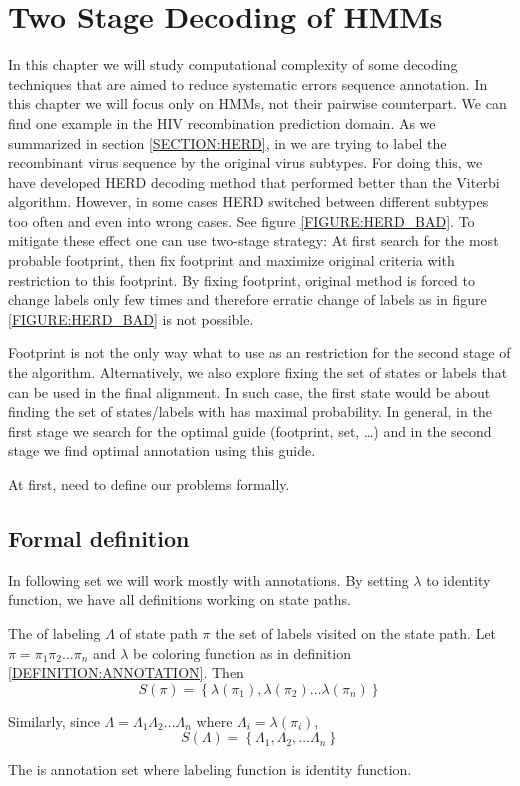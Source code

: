 \chapter{Two Stage Decoding of HMMs}

In this chapter we will study computational complexity of some decoding
techniques that are aimed to reduce systematic errors sequence annotation. In
this chapter we will focus only on HMMs, not their pairwise counterpart. We can
find one example in the HIV recombination prediction domain. As we summarized in 
section \ref{SECTION:HERD}, in  we are trying to label
the recombinant virus sequence by the original virus subtypes. For doing this,
we have developed HERD decoding method \cite{Nanasi2010, Nanasi2010mgr} that
performed better than the Viterbi algorithm. However, in some cases HERD
switched between different subtypes too often and even into wrong cases. See
figure \ref{FIGURE:HERD_BAD}. To mitigate these effect one can use two-stage
strategy: At first search for the most probable footprint, then fix footprint
and maximize original criteria with restriction to this footprint. By fixing
footprint, original method is forced to change labels only few times and
therefore erratic change of labels as in figure \ref{FIGURE:HERD_BAD} is not
possible.

Footprint is not the only way what to use as an restriction for the second stage
of the algorithm. Alternatively, we also explore fixing the set of states or
labels that can be used in the final alignment. In such case, the first state
would be about finding the set of states/labels with has maximal probability.
In general, in the first stage we search for the optimal guide (footprint, set,
\dots) and in the second stage we find optimal annotation using this guide.

At first, need to define our problems formally.
\section{Formal definition}

\begin{note}
In following set we will work mostly with annotations. By setting $\lambda$ to
identity function, we have all definitions working on state paths.
\end{note}

\begin{definition}
The  of labeling
$\Lambda$ of state path $\pi$ the set of labels visited on the state path.
Let $\pi = \pi_1\pi_2\dots \pi_n$ and $\lambda$ be coloring function as in definition
\ref{DEFINITION:ANNOTATION}. Then 
\[S(\pi) = \left\{\lambda(\pi_1), \lambda(\pi_2)\dots\lambda(\pi_n)\right\}\]

Similarly, since $\Lambda = \Lambda_1\Lambda_2\dots \Lambda_n$ where $\Lambda_i
= \lambda(\pi_i)$, 
\[S(\Lambda) =
\left\{\Lambda_1,\Lambda_2,\dots\Lambda_n\right\}\]

The  is annotation set where labeling function is identity
function.\label{DEFINITION:ANNOTATION_SET}
\end{definition}

